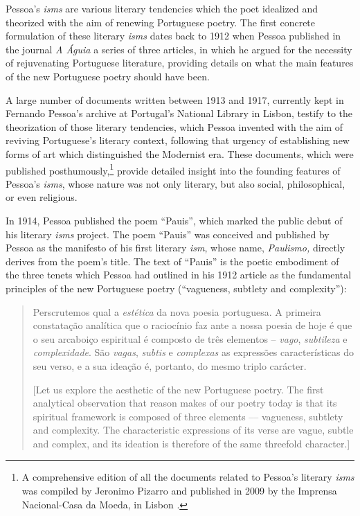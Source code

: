 \begin{paper}
Pessoa's \emph{isms} are various literary tendencies which the poet
idealized and theorized with the aim of renewing Portuguese poetry. The
first concrete formulation of these literary \emph{isms} dates back to
1912 when Pessoa published in the journal \emph{A Águia} a series of
three articles, in which he argued for the necessity of rejuvenating
Portuguese literature, providing details on what the main features of
the new Portuguese poetry should have been.

A large number of documents written between 1913 and 1917, currently
kept in Fernando Pessoa's archive at Portugal's National Library in
Lisbon, testify to the theorization of those literary tendencies, which
Pessoa invented with the aim of reviving Portuguese's literary context,
following that urgency of establishing new forms of art which
distinguished the Modernist era. These documents, which were published
posthumously,\footnote{A comprehensive edition of all the documents
  related to Pessoa's literary \emph{isms} was compiled by Jeronimo
  Pizarro and published in 2009 by the Imprensa Nacional-Casa da Moeda,
  in Lisbon \parencite{pessoa_sensacionismo_2009}.} provide detailed insight into the founding features of
Pessoa's \emph{isms}, whose nature was not only literary, but also
social, philosophical, or even religious.

In 1914, Pessoa published the poem ``Pauis'', which marked the public
debut of his literary \emph{isms} project. The poem ``Pauis'' was
conceived and published by Pessoa as the manifesto of his first literary
\emph{ism}, whose name, \emph{Paulismo,} directly derives from the
poem's title. The text of ``Pauis'' is the poetic embodiment of the
three tenets which Pessoa had outlined in his 1912 article as the
fundamental principles of the new Portuguese poetry (``vagueness,
subtlety and complexity''):

\begin{quote}
 Perscrutemos qual a \emph{estética} da nova poesia portuguesa. A
primeira constatação analítica que o raciocínio faz ante a nossa poesia
de hoje é que o seu arcaboiço espiritual é composto de três elementos
-- \emph{vago}, \emph{subtileza} e \emph{complexidade}. São
\emph{vagas}, \emph{subtis} e \emph{complexas} as expressões
características do seu verso, e a sua ideação é, portanto, do mesmo
triplo carácter.

\vspace{1em}

[Let us explore the aesthetic of the new Portuguese poetry. The first
analytical observation that reason makes of our poetry today is that its
spiritual framework is composed of three elements –– vagueness, subtlety
and complexity. The characteristic expressions of its verse are vague,
subtle and complex, and its ideation is therefore of the same threefold
character.]


\end{quote}
\end{paper}
